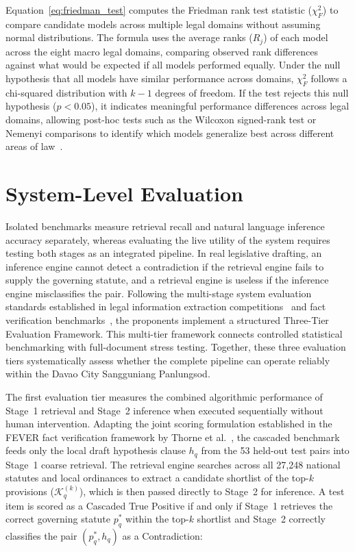     Equation~\ref{eq:friedman_test} computes the Friedman rank test statistic ($\chi_F^2$) to compare candidate models across multiple legal domains without assuming normal distributions. The formula uses the average ranks ($R_j$) of each model across the eight macro legal domains, comparing observed rank differences against what would be expected if all models performed equally. Under the null hypothesis that all models have similar performance across domains, $\chi_F^2$ follows a chi-squared distribution with $k - 1$ degrees of freedom. If the test rejects this null hypothesis ($p < 0.05$), it indicates meaningful performance differences across legal domains, allowing post-hoc tests such as the Wilcoxon signed-rank test or Nemenyi comparisons to identify which models generalize best across different areas of law~\cite{demsar2006statistical}.

    \section{System-Level Evaluation}
    \label{sec:system_evaluation_framework}
    Isolated benchmarks measure retrieval recall and natural language inference accuracy separately, whereas evaluating the live utility of the system requires testing both stages as an integrated pipeline. In real legislative drafting, an inference engine cannot detect a contradiction if the retrieval engine fails to supply the governing statute, and a retrieval engine is useless if the inference engine misclassifies the pair. Following the multi-stage system evaluation standards established in legal information extraction competitions~\cite{rabelo2022coliee, alshehri2026cross} and fact verification benchmarks~\cite{thorne2018fever}, the proponents implement a structured Three-Tier Evaluation Framework. This multi-tier framework connects controlled statistical benchmarking with full-document stress testing. Together, these three evaluation tiers systematically assess whether the complete pipeline can operate reliably within the Davao City Sangguniang Panlungsod.

    The first evaluation tier measures the combined algorithmic performance of Stage~1 retrieval and Stage~2 inference when executed sequentially without human intervention. Adapting the joint scoring formulation established in the FEVER fact verification framework by Thorne et al.~\cite{thorne2018fever}, the cascaded benchmark feeds only the local draft hypothesis clause $h_q$ from the 53 held-out test pairs into Stage~1 coarse retrieval. The retrieval engine searches across all 27,248 national statutes and local ordinances to extract a candidate shortlist of the top-$k$ provisions ($\mathcal{K}_q^{(k)}$), which is then passed directly to Stage~2 for inference. A test item is scored as a Cascaded True Positive if and only if Stage~1 retrieves the correct governing statute $p_q^*$ within the top-$k$ shortlist and Stage~2 correctly classifies the pair $(p_q^*, h_q)$ as a Contradiction:

